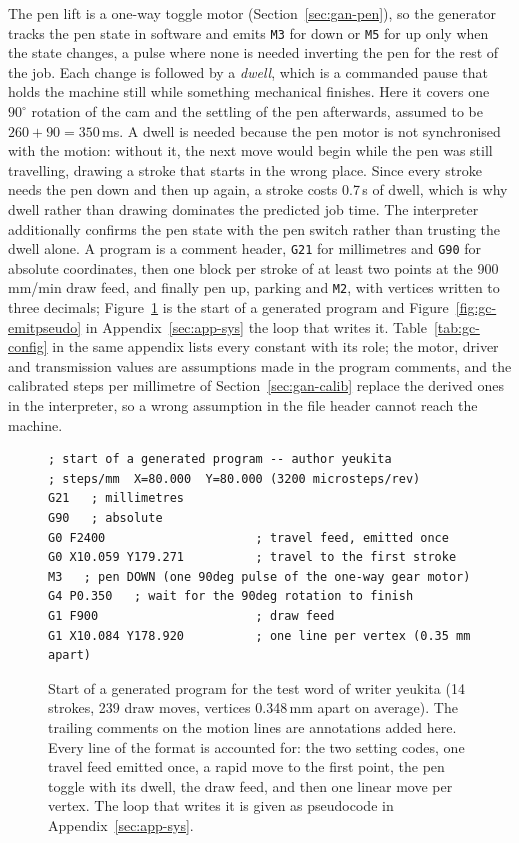 The pen lift is a one-way toggle motor (Section~\ref{sec:gan-pen}), so the generator tracks the pen state in software and emits \texttt{M3} for down or \texttt{M5} for up only when the state changes, a pulse where none is needed inverting the pen for the rest of the job.
Each change is followed by a \emph{dwell}, which is a commanded pause that holds the machine still while something mechanical finishes. Here it covers one $90^\circ$ rotation of the cam and the settling of the pen afterwards, assumed to be $260+90=350$\,ms. A dwell is needed because the pen motor is not synchronised with the motion: without it, the next move would begin while the pen was still travelling, drawing a stroke that starts in the wrong place. Since every stroke needs the pen down and then up again, a stroke costs 0.7\,s of dwell, which is why dwell rather than drawing dominates the predicted job time. The interpreter additionally confirms the pen state with the pen switch rather than trusting the dwell alone.
A program is a comment header, \texttt{G21} for millimetres and \texttt{G90} for absolute coordinates, then one block per stroke of at least two points at the 900\,mm/min draw feed, and finally pen up, parking and \texttt{M2}, with vertices written to three decimals; Figure~\ref{fig:gc-emit} is the start of a generated program and Figure~\ref{fig:gc-emitpseudo} in Appendix~\ref{sec:app-sys} the loop that writes it.
Table~\ref{tab:gc-config} in the same appendix lists every constant with its role; the motor, driver and transmission values are assumptions made in the program comments, and the calibrated steps per millimetre of Section~\ref{sec:gan-calib} replace the derived ones in the interpreter, so a wrong assumption in the file header cannot reach the machine.

\begin{figure}[!htbp]
\centering
\fontsize{8}{9.2}\selectfont
\begin{lstlisting}[basicstyle=\ttfamily\fontsize{8}{9.2}\selectfont,frame=none]
; start of a generated program -- author yeukita
; steps/mm  X=80.000  Y=80.000 (3200 microsteps/rev)
G21   ; millimetres
G90   ; absolute
G0 F2400                     ; travel feed, emitted once
G0 X10.059 Y179.271          ; travel to the first stroke
M3   ; pen DOWN (one 90deg pulse of the one-way gear motor)
G4 P0.350   ; wait for the 90deg rotation to finish
G1 F900                      ; draw feed
G1 X10.084 Y178.920          ; one line per vertex (0.35 mm apart)
\end{lstlisting}
\caption{Start of a generated program for the test word of writer yeukita (14 strokes, 239 draw moves, vertices 0.348\,mm apart on average). The trailing comments on the motion lines are annotations added here. Every line of the format is accounted for: the two setting codes, one travel feed emitted once, a rapid move to the first point, the pen toggle with its dwell, the draw feed, and then one linear move per vertex. The loop that writes it is given as pseudocode in Appendix~\ref{sec:app-sys}.}
\label{fig:gc-emit}
\end{figure}


